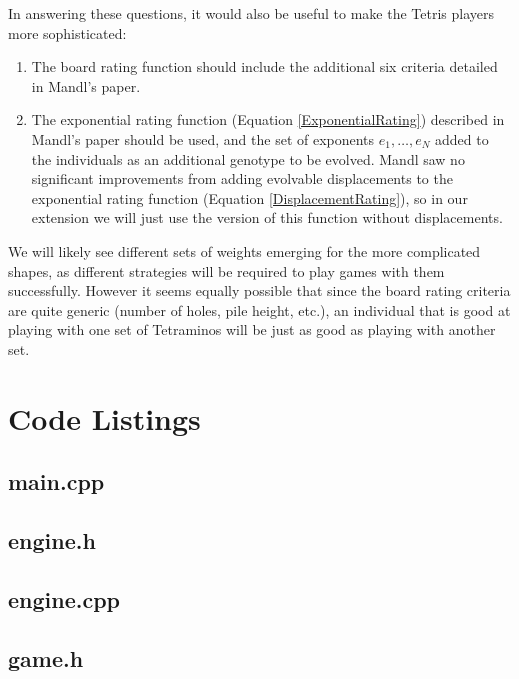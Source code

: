 \documentclass[a4paper,12pt]{article}
\begin{document}
In answering these questions, it would also be useful to make the Tetris players
more sophisticated:

\begin{enumerate}
  \item The board rating function should include the additional six criteria
      detailed in Mandl's paper.
  \item The exponential rating function (Equation \ref{ExponentialRating})
      described in Mandl's paper should be used, and the set of exponents
      $e_1, \ldots, e_N$ added to the individuals as an additional genotype to
      be evolved.
      Mandl saw no significant improvements from adding evolvable displacements
      to the exponential rating function (Equation \ref{DisplacementRating}),
      so in our extension we will just use the version of this function without
      displacements.
\end{enumerate}

We will likely see different sets of weights emerging for the more complicated
shapes, as different strategies will be required to play games with them
successfully.
However it seems equally possible that since the board rating criteria are
quite generic (number of holes, pile height, etc.), an individual that is good
at playing with one set of Tetraminos will be just as good as playing with
another set.



\appendix
\clearpage
\lstset{language=c++}
\section{Code Listings}

\subsection{main.cpp}


\clearpage
\subsection{engine.h}


\subsection{engine.cpp}


\clearpage
\subsection{game.h}

\end{document}
